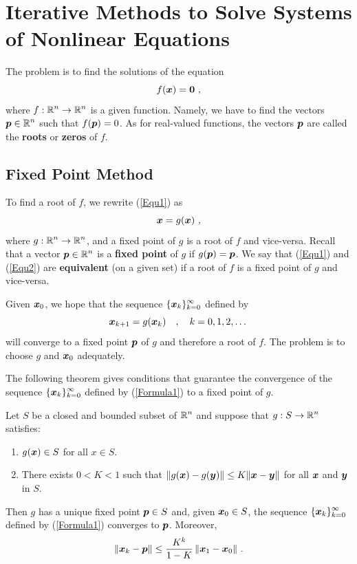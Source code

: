 \chapter{Iterative Methods to Solve Systems of Nonlinear Equations}
\label{chaptSeqD}

The problem is to find the solutions of the equation
\begin{equation} \label{Equ1}
f(\bm{x})  = \bm{0} \ ,
\end{equation}
where $\displaystyle f:\mathbb{R}^n \rightarrow \mathbb{R}^n$ is a given function.  Namely, we
have to find the vectors $\displaystyle \bm{p} \in \mathbb{R}^n$ such that
$f(\bm{p}) = 0$.
As for real-valued functions, the vectors $\bm{p}$ are called the
{\bfseries roots} or
{\bfseries zeros} of $f$.

\section{Fixed Point Method}

To find a root of $f$, we rewrite (\ref{Equ1}) as
\begin{equation} \label{Equ2}
\bm{x}  =  g(\bm{x}) \ ,
\end{equation}
where $\displaystyle g:\mathbb{R}^n \rightarrow \mathbb{R}^n$, and a fixed point of
$g$ is a root of $f$ and vice-versa.  Recall that a vector
$\displaystyle \bm{p} \in \mathbb{R}^n$ is a
{\bfseries fixed point} of $g$ if
$g(\bm{p}) = \bm{p}$.  We say that
(\ref{Equ1}) and (\ref{Equ2}) are
{\bfseries equivalent} (on a given
set) if a root of $f$ is a fixed point of $g$ and vice-versa.

Given $\bm{x}_0$, we hope that the sequence
$\displaystyle \{\bm{x}_k\}_{k=0}^\infty$ defined by
\begin{equation} \label{Formula1}
\bm{x}_{k+1} = g(\bm{x}_k)\quad ,\quad  k=0,1,2,\dots
\end{equation}
will converge to a fixed point $\bm{p}$ of $g$ and therefore a root
of $f$.  The problem is to choose $g$ and $\bm{x}_0$ adequately.

The following theorem gives conditions that guarantee the convergence
of the sequence
$\displaystyle \{\bm{x}_k\}_{k=0}^\infty$ defined by
(\ref{Formula1}) to a fixed point of $g$.

\begin{theorem}
Let $S$ be a closed and bounded subset of $\displaystyle \mathbb{R}^n$ and suppose that
$\displaystyle g:S \rightarrow \mathbb{R}^n$ satisfies:
\begin{enumerate}
\item $g(\bm{x})\in S$ for all $x\in S$.
\item There exists $0<K<1$ such that
$\| g(\bm{x}) - g(\bm{y}) \| \leq K \| \bm{x} - \bm{y} \|$ for all
$\bm{x}$ and $\bm{y}$ in $S$.
\end{enumerate}
Then $g$ has a unique fixed point $\bm{p} \in S$ and, given
$\bm{x}_0 \in S $, the sequence
$\displaystyle \{\bm{x}_k\}_{k=0}^\infty$
defined by (\ref{Formula1}) converges to $\bm{p}$.  Moreover,
\[
\| \bm{x}_k - \bm{p} \| \leq \frac{K^k}{1-K}\,
\| \bm{x}_1 - \bm{x}_0 \| \ .
\]
\label{FixedPTinRN}
\end{theorem}

